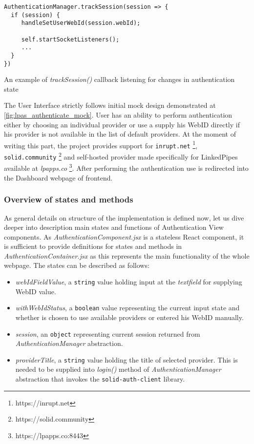 \begin{listing}[H]    
\begin{verbatim}
AuthenticationManager.trackSession(session => {
  if (session) {
     handleSetUserWebId(session.webId);

     self.startSocketListeners();
     ...
  }
})
\end{verbatim}
\caption{An example of \textit{trackSession()} callback listening for changes in authentication state} 
\label{lst:track_session_example}
\end{listing}

The User Interface strictly follows initial mock design demonstrated at \autoref{fig:lpas_authenticate_mock}. User has an ability to perform authentication either by choosing an individual \solid{} provider or use a supply his WebID directly if his \solid{} provider is not available in the list of default providers. At the moment of writing this part, the project provides support for \texttt{inrupt.net} \footnote{https://inrupt.net}, \texttt{solid.community} \footnote{https://solid.community} and self-hosted provider made specifically for LinkedPipes available at \textit{lpapps.co} \footnote{https://lpapps.co:8443}. After performing the authentication use is redirected into the Dashboard webpage of \lpa{} frontend.

\subsubsection{Overview of states and methods}

As general details on structure of the implementation is defined now, let us dive deeper into description main states and functions of Authentication View components. As \textit{AuthenticationComponent.jsx} is a stateless React component, it is sufficient to provide definitions for states and methods in \textit{AuthenticationContainer.jsx} as this represents the main functionality of the whole webpage. The states can be described as follows:
\begin{itemize}
	\item \textit{webIdFieldValue}, a \texttt{string} value holding input at the \textit{textfield} for supplying WebID value.
	\item \textit{withWebIdStatus}, a \texttt{boolean} value representing the current input state and whether is chosen to use available providers or entered his WebID manually.
	\item \textit{session}, an \texttt{object} representing current session returned from \textit{AuthenticationManager} abstraction.
	\item \textit{providerTitle}, a \texttt{string} value holding the title of selected provider. This is needed to be supplied into \textit{login()} method of \textit{AuthenticationManager} abstraction that invokes the \texttt{solid-auth-client} library.  
\end{itemize}

